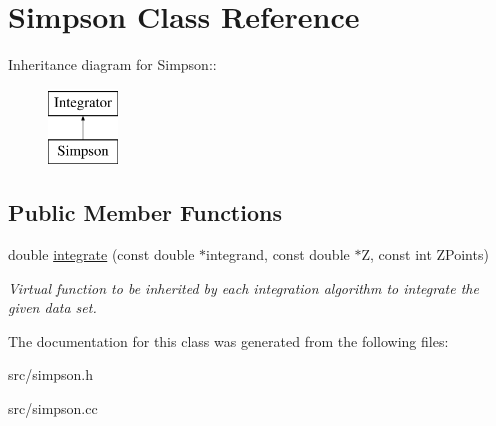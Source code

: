 \hypertarget{classSimpson}{
\section{Simpson Class Reference}
\label{d7/d99/classSimpson}
}
Inheritance diagram for Simpson::\begin{figure}[H]
\begin{center}
\leavevmode
\includegraphics[height=2cm]{d7/d99/classSimpson}
\end{center}
\end{figure}
\subsection*{Public Member Functions}
\begin{DoxyCompactItemize}
\item 
\hypertarget{classSimpson_ab90da2fb197efe2f4a669bf5029a16f4}{
double \hyperlink{classSimpson_ab90da2fb197efe2f4a669bf5029a16f4}{integrate} (const double $\ast$integrand, const double $\ast$Z, const int ZPoints)}
\label{d7/d99/classSimpson_ab90da2fb197efe2f4a669bf5029a16f4}

\begin{DoxyCompactList}\small\item\em Virtual function to be inherited by each integration algorithm to integrate the given data set. \item\end{DoxyCompactList}\end{DoxyCompactItemize}


The documentation for this class was generated from the following files:\begin{DoxyCompactItemize}
\item 
src/simpson.h\item 
src/simpson.cc\end{DoxyCompactItemize}
